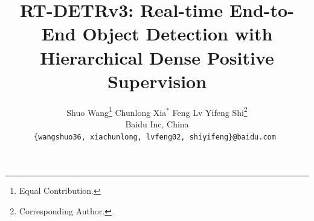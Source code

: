 \documentclass[10pt,twocolumn,letterpaper]{article}
\begin{document}
\title{\textbf{RT-DETRv3: Real-time End-to-End Object Detection with Hierarchical Dense Positive Supervision}}


\author
{ 
Shuo Wang\thanks{Equal Contribution.}
\quad
Chunlong Xia$^*$
\quad
Feng Lv
\quad
Yifeng Shi\thanks{Corresponding Author.}
\\
Baidu Inc, China
\\
\tt\small\{wangshuo36, xiachunlong, lvfeng02, shiyifeng\}@baidu.com
}

\maketitle
\thispagestyle{empty}
\end{document}
